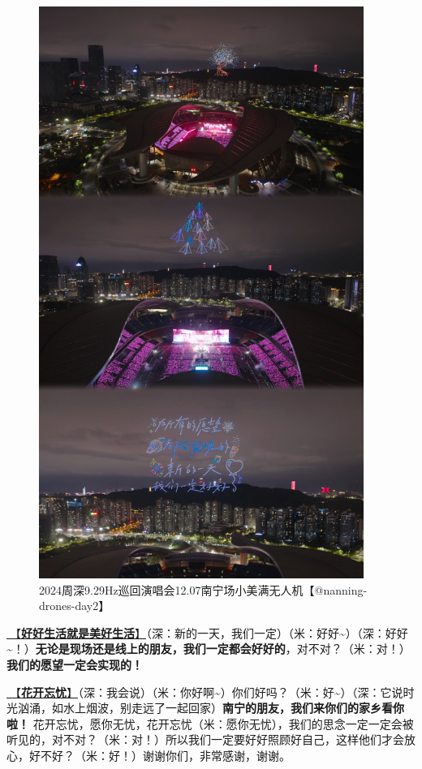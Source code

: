 \documentclass[]{ctexbook}
\begin{document}
\begin{figure}

{\centering \includegraphics[width=300pt]{img/nanning20241207/001} 

}

\caption{2024周深9.29Hz巡回演唱会12.07南宁场小美满无人机【@nanning-drones-day2】}\label{fig:unnamed-chunk-145}
\end{figure}

\hyperref[live-happy-life-happy]{🎵【\textbf{好好生活就是美好生活}】}（深：新的一天，我们一定）（米：好好\textasciitilde）（深：好好\textasciitilde！）\textbf{无论是现场还是线上的朋友，我们一定都会好好的}，对不对？（米：对！）\textbf{我们的愿望一定会实现的！}

\hyperref[no-worries]{🎵【\textbf{花开忘忧}】}（深：我会说）（米：你好啊\textasciitilde）你们好吗？（米：好\textasciitilde）（深：它说时光汹涌，如水上烟波，别走远了一起回家）\textbf{南宁的朋友，我们来你们的家乡看你啦！} 花开忘忧，愿你无忧，花开忘忧（米：愿你无忧），我们的思念一定一定会被听见的，对不对？（米：对！）所以我们一定要好好照顾好自己，这样他们才会放心，好不好？（米：好！）谢谢你们，非常感谢，谢谢。
\end{document}
